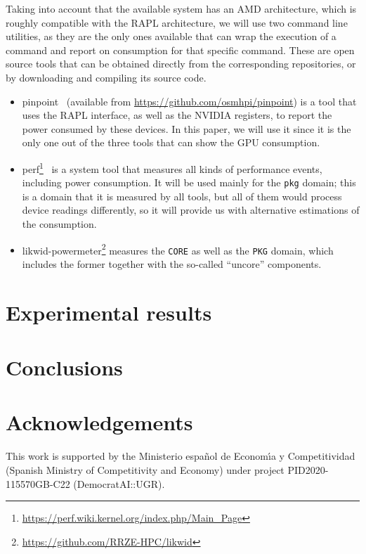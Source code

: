\documentclass[a4paper,twoside]{article}
\begin{document}
Taking into account that the available system has an AMD architecture, which is
roughly compatible with the RAPL architecture, we will use two command line
utilities, as they are the only ones available that can wrap the execution of a command
and report on consumption for that specific command. These are open source tools
that can be obtained directly from the corresponding repositories, or by downloading and
compiling its source code. \begin{itemize}
\item {\sf pinpoint}~\cite{9307947} (available from
  \url{https://github.com/osmhpi/pinpoint}) is a tool that uses the RAPL
  interface, as well as the NVIDIA registers, to report the power consumed by
  these devices. In this paper, we will use it since it is the only one out of
  the three tools that can show the GPU consumption.
\item {\sf
    perf}\footnote{\url{https://perf.wiki.kernel.org/index.php/Main_Page}}~\cite{treibig2010likwid} is a
  system tool that measures all kinds of performance events, including power
  consumption. It will be used mainly for the  \texttt{pkg} domain; this is a
  domain that it is measured by all tools, but all of them would process device
    readings differently, so it will provide us with alternative estimations of
    the consumption. %
\item {\sf likwid-powermeter}\footnote{\url{https://github.com/RRZE-HPC/likwid}}
  measures the \texttt{CORE} as well as the \texttt{PKG} domain, which includes
  the former together with the so-called ``uncore'' components.
  
\end{itemize}

\section{Experimental results}
\label{sec:res}

\section{Conclusions}
\label{sec:conc}

\section*{Acknowledgements}

This work is supported by the Ministerio espa\~{n}ol de Econom\'{\i}a y
Competitividad (Spanish Ministry of Competitivity and Economy) under project
PID2020-115570GB-C22 (DemocratAI::UGR).



{\small
}
\end{document}
